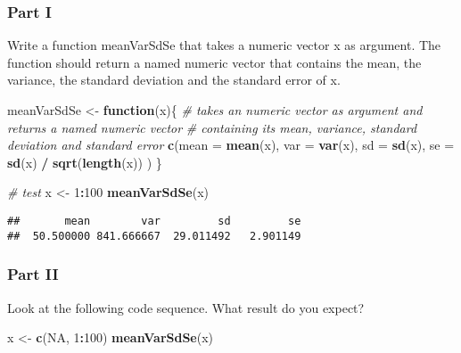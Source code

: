 \documentclass[12,]{article}
\newenvironment{Shaded}{\begin{snugshade}}{\end{snugshade}}
\newcommand{\KeywordTok}[1]{\textcolor[rgb]{0.13,0.29,0.53}{\textbf{#1}}}
\newcommand{\DataTypeTok}[1]{\textcolor[rgb]{0.13,0.29,0.53}{#1}}
\newcommand{\DecValTok}[1]{\textcolor[rgb]{0.00,0.00,0.81}{#1}}
\newcommand{\StringTok}[1]{\textcolor[rgb]{0.31,0.60,0.02}{#1}}
\newcommand{\CommentTok}[1]{\textcolor[rgb]{0.56,0.35,0.01}{\textit{#1}}}
\newcommand{\OtherTok}[1]{\textcolor[rgb]{0.56,0.35,0.01}{#1}}
\newcommand{\ControlFlowTok}[1]{\textcolor[rgb]{0.13,0.29,0.53}{\textbf{#1}}}
\newcommand{\OperatorTok}[1]{\textcolor[rgb]{0.81,0.36,0.00}{\textbf{#1}}}
\newcommand{\NormalTok}[1]{#1}
\begin{document}
\subsubsection*{Part I}\label{part-i}

Write a function meanVarSdSe that takes a numeric vector x as argument.
The function should return a named numeric vector that contains the
mean, the variance, the standard deviation and the standard error of x.

\begin{Shaded}
\begin{Highlighting}[]
\NormalTok{meanVarSdSe <-}\StringTok{ }\ControlFlowTok{function}\NormalTok{(x)\{}
  \CommentTok{# takes an numeric vector as argument and returns a named numeric vector }
  \CommentTok{# containing its mean, variance, standard deviation and standard error }
  \KeywordTok{c}\NormalTok{(}\DataTypeTok{mean =} \KeywordTok{mean}\NormalTok{(x),}
    \DataTypeTok{var =} \KeywordTok{var}\NormalTok{(x),}
    \DataTypeTok{sd =} \KeywordTok{sd}\NormalTok{(x),}
    \DataTypeTok{se =} \KeywordTok{sd}\NormalTok{(x) }\OperatorTok{/}\StringTok{ }\KeywordTok{sqrt}\NormalTok{(}\KeywordTok{length}\NormalTok{(x))}
\NormalTok{  )}
\NormalTok{\}}

\CommentTok{# test}
\NormalTok{x <-}\StringTok{ }\DecValTok{1}\OperatorTok{:}\DecValTok{100}
\KeywordTok{meanVarSdSe}\NormalTok{(x)}
\end{Highlighting}
\end{Shaded}

\begin{verbatim}
##       mean        var         sd         se 
##  50.500000 841.666667  29.011492   2.901149
\end{verbatim}

\subsubsection*{Part II}\label{part-ii}

Look at the following code sequence. What result do you expect?

\begin{Shaded}
\begin{Highlighting}[]
\NormalTok{x <-}\StringTok{ }\KeywordTok{c}\NormalTok{(}\OtherTok{NA}\NormalTok{, }\DecValTok{1}\OperatorTok{:}\DecValTok{100}\NormalTok{)}
\KeywordTok{meanVarSdSe}\NormalTok{(x)}
\end{Highlighting}
\end{Shaded}
\end{document}
